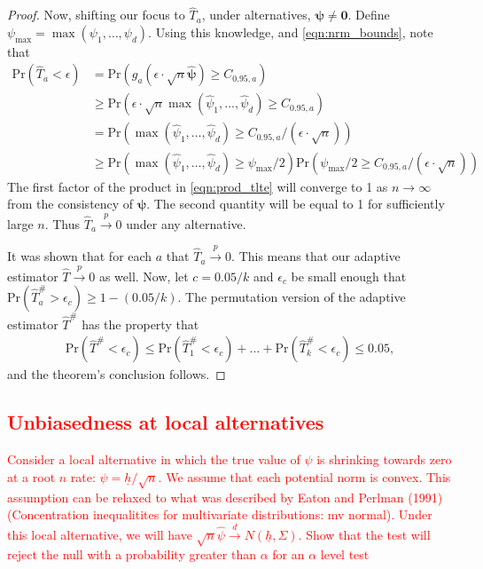 \documentclass{article}
\newcommand{\sh}{\textcolor{red}}
\newcommand{\pr}{\text{Pr}}
\begin{document}
\begin{proof}
Now, shifting our focus to $\hat{T}_a$, under alternatives, $\boldsymbol{\psi} \neq \boldsymbol{0}$. Define $\psi_{\max} = \max(\psi_1, \dots, \psi_d)$.  Using this knowledge, and \eqref{eqn:nrm_bounds}, note that 
\begin{align}
\pr\left(\hat{T}_a < \epsilon\right) &= \pr\left(g_a\left(\epsilon \cdot \sqrt{n} \hat{\boldsymbol{\psi}}\right) \geq C_{0.95, a}\right) \nonumber\\
&\geq \pr\left(\epsilon \cdot \sqrt{n}\max(\hat{\psi}_1, \dots, \hat{\psi}_d) \geq C_{0.95, a}\right) \nonumber \\
&= \pr\left(\max(\hat{\psi}_1, \dots, \hat{\psi}_d) \geq C_{0.95, a}/\left(\epsilon \cdot \sqrt{n}\right)\right) \nonumber \\
&\geq \pr\left(\max(\hat{\psi}_1, \dots, \hat{\psi}_d) \geq \psi_{\max}/2\right) \pr\left(\psi_{\max}/2\geq C_{0.95, a}/\left(\epsilon \cdot \sqrt{n}\right)\right) \label{eqn:prod_tlte} 
\end{align}
The first factor of the product in \eqref{eqn:prod_tlte} will converge to 1 as $n \to \infty$ from the consistency of $\hat{\boldsymbol{\psi}}$.  The second quantity will be equal to 1 for sufficiently large $n$.   Thus $\hat{T}_a \xrightarrow{p} 0$ under any alternative.   

It was shown that for each $a$ that $\hat{T}_a \xrightarrow{p} 0$.  This means that our adaptive estimator $\hat{T} \xrightarrow{p} 0$ as well.  Now, let $c = 0.05/k$ and $\epsilon_c$ be small enough that $\pr\left(\hat{T}^\#_a  > \epsilon_c\right) \geq 1 - (0.05/k)$.  The permutation version of the adaptive estimator $\hat{T}^\#$ has the property that
\begin{align*}
	\pr\left(\hat{T}^\# < \epsilon_c\right) \leq \pr(\hat{T}^\#_1 < \epsilon_c) + \dots + \pr(\hat{T}^\#_k < \epsilon_c) \leq 0.05,
\end{align*}
and the theorem's conclusion follows.
\end{proof}

\sh{\subsection{Unbiasedness at local alternatives}
Consider a local alternative in which the true value of $\psi$ is shrinking towards zero at a root $n$ rate: $\psi = \underline{h}/\sqrt{n}$.  We assume that each potential norm is convex.  This assumption can be relaxed to what was described by Eaton and Perlman (1991) (Concentration inequalitites for multivariate distributions: mv normal).  Under this local alternative, we will have $\sqrt{n} \hat{\psi} \xrightarrow{d} N(\underline{h}, \Sigma)$.    
Show that the test will reject the null with a probability greater than $\alpha$ for an $\alpha$ level test}
\end{document}
